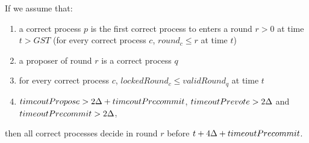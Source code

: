 \begin{lemma}
	\label{lemma:round-synchronisation}
If we assume that:
\begin{enumerate}
	\item a correct process $p$ is the first correct process to enters a round $r>0$ at time $t > GST$ (for every correct process $c$, $round_c \le r$ at time $t$)
	\item a proposer of round $r$ is a correct process $q$ 
	\item for every correct process $c$, $lockedRound_c \le validRound_q$ at time $t$
	\item $timeoutPropose > 2\Delta + timeoutPrecommit$, $timeoutPrevote > 2\Delta$ and $timeoutPrecommit > 2\Delta$,
\end{enumerate}
then all correct processes decide in round $r$ before $t + 4\Delta + timeoutPrecommit$.  
\end{lemma}	

